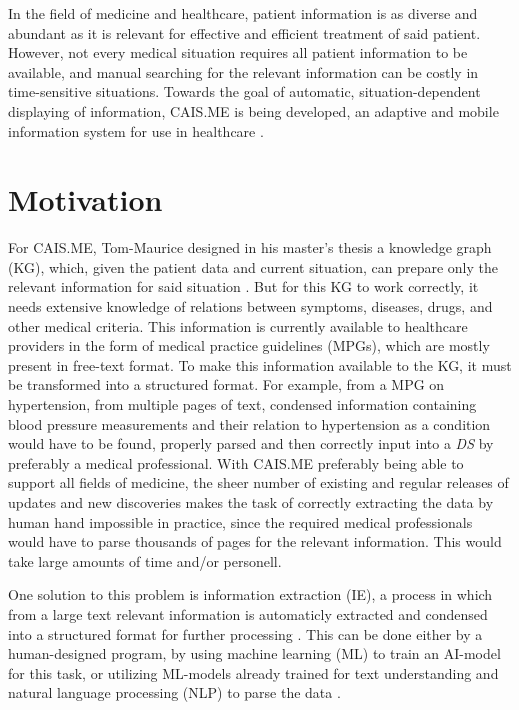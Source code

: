 \documentclass[bs, english]{stthesis}
\begin{document}
In the field of medicine and healthcare, patient information is as diverse and abundant as it is relevant for effective and efficient treatment of said patient. However, not every medical situation requires all patient information to be available, and manual searching for the relevant information can be costly in time-sensitive situations. Towards the goal of automatic, situation-dependent displaying of information, CAIS.ME is being developed, an adaptive and mobile information system for use in healthcare \cite{ContextSensitiveDataGlasses}.

\section{Motivation}


For CAIS.ME, Tom-Maurice \citeauthor{TOM} designed in his master's thesis a knowledge graph (KG), which, given the patient data and current situation, can prepare only the relevant information for said situation \cite{TOM}.
But for this KG to work correctly, it needs extensive knowledge of relations between symptoms, diseases, drugs, and other medical criteria. This information is currently available to healthcare providers in the form of medical practice guidelines (MPGs), which are mostly present in free-text format. To make this information available to the KG, it must be transformed into a structured format. For example, from a MPG on hypertension, from multiple pages of text, condensed information containing blood pressure measurements and their relation to hypertension as a condition would have to be found, properly parsed and then correctly input into a \textit{DS} by preferably a medical professional. With CAIS.ME preferably being able to support all fields of medicine, the sheer number of existing and regular releases of updates and new discoveries makes the task of correctly extracting the data by human hand impossible in practice, since the required medical professionals would have to parse thousands of pages for the relevant information. This would take large amounts of time and/or personell.

One solution to this problem is information extraction (IE), a process in which from a large text relevant information is automaticly extracted and condensed into a structured format for further processing \cite{cowieInformationExtraction1996,grishmanInformationExtraction2015}. This can be done either by a human-designed program, by using machine learning \cite{samuelStudiesMachineLearning1959} (ML) to train an AI-model for this task, or utilizing ML-models already trained for text understanding and natural language processing (NLP) to parse the data \cite{smallReviewInformationExtraction2014}.
\end{document}
